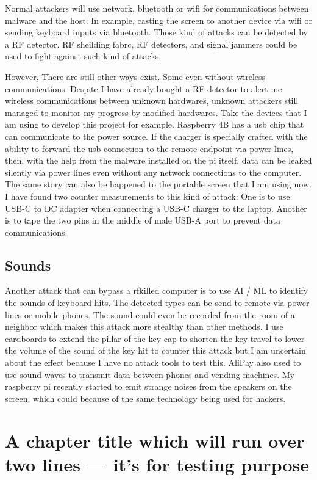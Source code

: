 \documentclass[mscthesis]{usiinfthesis}
\begin{document}
Normal attackers will use network, bluetooth or wifi for communications between malware and the host. In example, casting the screen to another device via wifi or sending keyboard inputs via bluetooth. Those kind of attacks can be detected by a RF detector. RF sheilding fabrc, RF detectors, and signal jammers could be used to fight against such kind of attacks.\par
However, There are still other ways exist. Some even without wireless communications. Despite I have already bought a RF detector to alert me wireless communications between unknown hardwares, unknown attackers still managed to monitor my progress by modified hardwares. Take the devices that I am using to develop this project for example. Raspberry 4B has a usb chip that can communicate to the power source. If the charger is specially crafted with the ability to forward the usb connection to the remote endpoint via power lines, then, with the help from the malware installed on the pi itself, data can be leaked silently via power lines even without any network connections to the computer. The same story can also be happened to the portable screen that I am using now. I have found two counter measurements to this kind of attack: One is to use USB-C to DC adapter when connecting a USB-C charger to the laptop. Another is to tape the two pins in the middle of male USB-A port to prevent data communications.

\section{Sounds}

Another attack that can bypass a rfkilled computer is to use AI / ML to identify the sounds of keyboard hits. The detected types can be send to remote via power lines or mobile phones. The sound could even be recorded from the room of a neighbor which makes this attack more stealthy than other methods. I use cardboards to extend the pillar of the key cap to shorten the key travel to lower the volume of the sound of the key hit to counter this attack but I am uncertain about the effect because I have no attack tools to test this. AliPay also used to use sound waves to transmit data between phones and vending machines. My raspberry pi recently started to emit strange noises from the speakers on the screen, which could because of the same technology being used for hackers.

\chapter[Short title]{A chapter title which will run over two lines --- it's for
  testing purpose}
\end{document}
